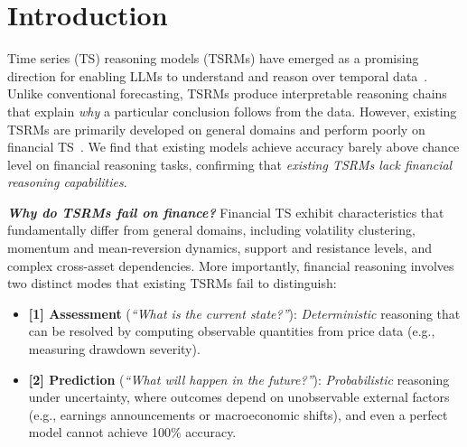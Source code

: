 \section{Introduction}
Time series (TS) reasoning models (TSRMs) have emerged as a promising direction for enabling LLMs to understand and reason over temporal data~\cite{timeomni1, thoth2026, patra2026}.
Unlike conventional forecasting, TSRMs produce interpretable reasoning chains that explain \textit{why} a particular conclusion follows from the data.
However, existing TSRMs are primarily developed 
on general domains and perform poorly 
on
financial TS~\cite{merrill2024towards}.
We find that existing 
models achieve accuracy barely above chance level on financial reasoning tasks, confirming that \textit{existing TSRMs lack financial reasoning capabilities}.


\textit{\textbf{Why do TSRMs fail on finance?}}
Financial TS exhibit characteristics that fundamentally differ from general domains,
including volatility clustering, momentum and mean-reversion dynamics, support and resistance levels, and complex cross-asset dependencies.
More importantly, financial reasoning involves two distinct modes that existing TSRMs fail to distinguish:
\begin{itemize}
\item \textbf{[1] Assessment} (\textit{``What is the current state?''}): \textit{Deterministic} reasoning that can be resolved by computing observable quantities from price data (e.g., measuring drawdown severity).
\item \textbf{[2] Prediction} (\textit{``What will happen in the future?''}): \textit{Probabilistic} reasoning under uncertainty, where outcomes depend on unobservable external factors (e.g., earnings announcements or macroeconomic shifts), 
and even a perfect model cannot achieve 100\% accuracy.
\end{itemize}

